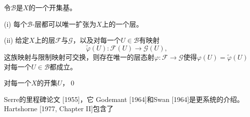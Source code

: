 \begin{pro} \label{pro:1.1.12}
	令$\mathscr{B}$是$X$的一个开集基。
	\begin{compactitem}
		\item[{\rm (i)}] 每个$\mathscr{B}$-层都可以唯一扩张为$X$上的一个层。
		\item[{\rm (ii)}] 给定$X$上的层$\mathscr{F}$与$\mathscr{G}$，以及对每一个$U\in \mathscr{B}$有映射
		\[
		\tilde{\varphi}(U):\mathscr{F}(U)\to \mathscr{G}(U),
		\]
		这族映射与限制映射可交换，则存在唯一的层态射$\varphi:\mathscr{F}\to \mathscr{G}$使得$\varphi(U)=\tilde{\varphi}(U)$对每一个$U\in \mathscr{B}$都成立。
	\end{compactitem}
\end{pro}

\proof 对每一个$X$的开集$U$，\nottran \qed

 \label{ref:1}Serre的里程碑论文 [1955]，它 \nottran Godemant [1964]和Swan [1964]是更系统的介绍。Hartshorne [1977, Chapter II]包含了\nottran
